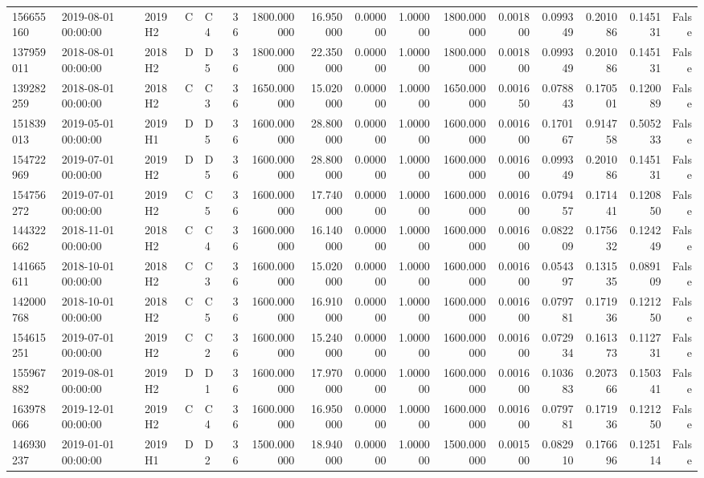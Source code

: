 \begin{tabular}{lllllrrrrrrrrrrr}
156655160 & 2019-08-01 00:00:00 & 2019H2 & C & C4 & 36 & 1800.000000 & 16.950000 & 0.000000 & 1.000000 & 1800.000000 & 0.001800 & 0.099349 & 0.201086 & 0.145131 & False \\
137959011 & 2018-08-01 00:00:00 & 2018H2 & D & D5 & 36 & 1800.000000 & 22.350000 & 0.000000 & 1.000000 & 1800.000000 & 0.001800 & 0.099349 & 0.201086 & 0.145131 & False \\
139282259 & 2018-08-01 00:00:00 & 2018H2 & C & C3 & 36 & 1650.000000 & 15.020000 & 0.000000 & 1.000000 & 1650.000000 & 0.001650 & 0.078843 & 0.170501 & 0.120089 & False \\
151839013 & 2019-05-01 00:00:00 & 2019H1 & D & D5 & 36 & 1600.000000 & 28.800000 & 0.000000 & 1.000000 & 1600.000000 & 0.001600 & 0.170167 & 0.914758 & 0.505233 & False \\
154722969 & 2019-07-01 00:00:00 & 2019H2 & D & D5 & 36 & 1600.000000 & 28.800000 & 0.000000 & 1.000000 & 1600.000000 & 0.001600 & 0.099349 & 0.201086 & 0.145131 & False \\
154756272 & 2019-07-01 00:00:00 & 2019H2 & C & C5 & 36 & 1600.000000 & 17.740000 & 0.000000 & 1.000000 & 1600.000000 & 0.001600 & 0.079457 & 0.171441 & 0.120850 & False \\
144322662 & 2018-11-01 00:00:00 & 2018H2 & C & C4 & 36 & 1600.000000 & 16.140000 & 0.000000 & 1.000000 & 1600.000000 & 0.001600 & 0.082209 & 0.175632 & 0.124249 & False \\
141665611 & 2018-10-01 00:00:00 & 2018H2 & C & C3 & 36 & 1600.000000 & 15.020000 & 0.000000 & 1.000000 & 1600.000000 & 0.001600 & 0.054397 & 0.131535 & 0.089109 & False \\
142000768 & 2018-10-01 00:00:00 & 2018H2 & C & C5 & 36 & 1600.000000 & 16.910000 & 0.000000 & 1.000000 & 1600.000000 & 0.001600 & 0.079781 & 0.171936 & 0.121250 & False \\
154615251 & 2019-07-01 00:00:00 & 2019H2 & C & C2 & 36 & 1600.000000 & 15.240000 & 0.000000 & 1.000000 & 1600.000000 & 0.001600 & 0.072934 & 0.161373 & 0.112731 & False \\
155967882 & 2019-08-01 00:00:00 & 2019H2 & D & D1 & 36 & 1600.000000 & 17.970000 & 0.000000 & 1.000000 & 1600.000000 & 0.001600 & 0.103683 & 0.207366 & 0.150341 & False \\
163978066 & 2019-12-01 00:00:00 & 2019H2 & C & C4 & 36 & 1600.000000 & 16.950000 & 0.000000 & 1.000000 & 1600.000000 & 0.001600 & 0.079781 & 0.171936 & 0.121250 & False \\
146930237 & 2019-01-01 00:00:00 & 2019H1 & D & D2 & 36 & 1500.000000 & 18.940000 & 0.000000 & 1.000000 & 1500.000000 & 0.001500 & 0.082910 & 0.176696 & 0.125114 & False \\

\end{tabular}
